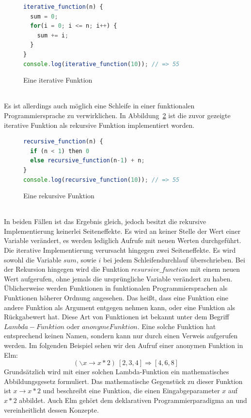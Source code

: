 \begin{figure}[ht]
\begin{lstlisting}[language=JavaScript]
iterative_function(n) {
  sum = 0;
  for(i = 0; i <= n; i++) {
    sum += i;
  }
}
console.log(iterative_function(10)); // => 55
\end{lstlisting}
\caption{Eine iterative Funktion}\label{fig:iterative-function}
\end{figure}
\\Es ist allerdings auch möglich eine Schleife in einer funktionalen Programmiersprache zu verwirklichen. In Abbildung~\ref{fig:recursive-function} ist die zuvor gezeigte iterative Funktion als rekursive Funktion implementiert worden.
\begin{figure}[ht]
\begin{lstlisting}[language=JavaScript]
recursive_function(n) {
  if (n < 1) then 0
  else recursive_function(n-1) + n;
}
console.log(recursive_function(10)); // => 55
\end{lstlisting}
\caption{Eine rekursive Funktion}\label{fig:recursive-function}
\end{figure}
\\In beiden Fällen ist das Ergebnis gleich, jedoch besitzt die rekursive Implementierung keinerlei Seiteneffekte. Es wird an keiner Stelle der Wert einer Variable verändert, es werden lediglich Aufrufe mit neuen Werten durchgeführt. Die iterative Implementierung verursacht hingegen zwei Seiteneffekte. Es wird sowohl die Variable $sum$, sowie $i$ bei jedem Schleifendurchlauf überschrieben. Bei der Rekursion hingegen wird  die Funktion $resursive\_function$
mit einem neuen Wert aufgerufen, ohne jemals die ursprüngliche Variable verändert zu haben.
Üblicherweise werden Funktionen in funktionalen Programmiersprachen als Funktionen höherer Ordnung angesehen. Das heißt, dass eine Funktion eine andere Funktion als Argument entgegen nehmen kann, oder eine Funktion als Rückgabewert hat. Diese Art von Funktionen ist bekannt unter dem Begriff $Lambda-Funktion$ oder $anonyme Funktion$. Eine solche Funktion hat entsprechend keinen Namen, sondern kann nur durch einen Verweis aufgerufen werden. Im folgenden Beispiel sehen wir den Aufruf einer anonymen Funktion in Elm:
\begin{equation} \label{eq:solve}
(\backslash x \rightarrow x * 2)\ [ 2, 3, 4 ] \Longrightarrow [4, 6, 8]
\end{equation}
Grundsätzlich wird mit einer solchen Lambda-Funktion ein mathematisches Abbildungsgesetz formuliert. Das mathematische Gegenstück zu dieser Funktion ist
$x \rightarrow x * 2$
und beschreibt eine Funktion, die einen Eingabgeparameter $x$ auf $x*2$ abbildet. Auch Elm gehört dem deklarativen Programmierparadigma an und vereinheitlicht dessen Konzepte.

